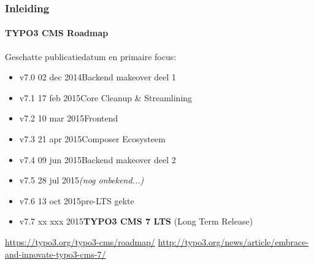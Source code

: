 
\begin{frame}[fragile]
	\frametitle{Inleiding}
	\framesubtitle{TYPO3 CMS Roadmap}

	Geschatte publicatiedatum en primaire focus:

	\begin{itemize}
		\item
			\begingroup
				\color{typo3orange}
					v7.0 \textrightarrow\tabto{1.3cm}02 dec 2014\tabto{3.4cm}Backend makeover deel 1
			\endgroup

		\item v7.1 \textrightarrow\tabto{1.3cm}17 feb 2015\tabto{3.4cm}Core Cleanup \& Streamlining
		\item v7.2 \textrightarrow\tabto{1.3cm}10 mar 2015\tabto{3.4cm}Frontend
		\item v7.3 \textrightarrow\tabto{1.3cm}21 apr 2015\tabto{3.4cm}Composer Ecosysteem
		\item v7.4 \textrightarrow\tabto{1.3cm}09 jun 2015\tabto{3.4cm}Backend makeover deel 2
		\item v7.5 \textrightarrow\tabto{1.3cm}28 jul 2015\tabto{3.4cm}\textit{(nog onbekend...)}
		\item v7.6 \textrightarrow\tabto{1.3cm}13 oct 2015\tabto{3.4cm}pre-LTS gekte
		\item v7.7 \textrightarrow\tabto{1.3cm}xx xxx 2015\tabto{3.4cm}\textbf{TYPO3 CMS 7 LTS} (Long Term Release)
	\end{itemize}

	\smaller
		\url{https://typo3.org/typo3-cms/roadmap/}\newline
		\url{http://typo3.org/news/article/embrace-and-innovate-typo3-cms-7/}
	\normalsize

\end{frame}


